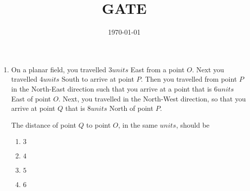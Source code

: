 \documentclass[12pt]{article}
\begin{document}
\title{GATE}
\date{\today}
\maketitle
\begin{enumerate}
\item On a planar field, you travelled $3 units$ East from a point $O$. Next you 
travelled $4 units$ South to arrive at point $P$. Then you travelled from point $P$ in the
North-East direction such that you arrive at a point that is $6 units$ East of
point $O$. Next, you travelled in the North-West direction, so that you arrive
at point $Q$ that is $8 units$ North of point $P$. 

The distance of point $Q$ to point $O$, in the same $units$, should be    
\begin{enumerate}[label=(\Alph*)]
\item $3$
\item $4$
\item $5$
\item $6$
\end{enumerate}
\end{enumerate}
\end{document}
